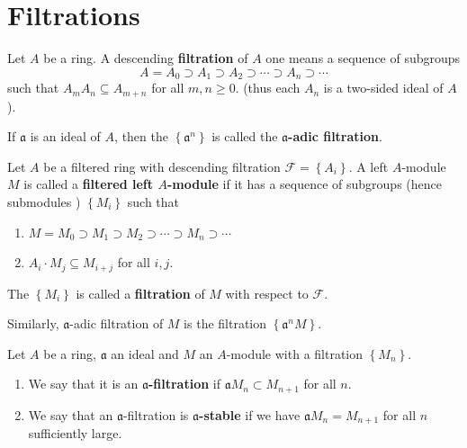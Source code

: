 \section{Filtrations} %
\begin{definition}
    Let $A$ be a ring.
    A descending \textbf{filtration} of $A$ one means a sequence of subgroups
    \begin{equation*}
        A=A_0 \supset A_1 \supset A_2 \supset \cdots \supset A_n \supset \cdots
    \end{equation*}
    such that $A_m A_n \subseteq A_{m+n}$ for all $m, n \geqslant 0$. (thus each $A_n$ is a two-sided ideal of $A$).

    If $\mathfrak{a}$ is an ideal of $A$, then the $\left\{\mathfrak{a}^n\right\}$ is called the \textbf{$\mathfrak{a}$-adic filtration}.
\end{definition}
\begin{definition}
    Let $A$ be a filtered ring with descending filtration $\mathcal{F}=\left\{A_i\right\}$.
    A left $A$-module $M$ is called a \textbf{filtered left $A$-module} if it has a sequence of subgroups (hence submodules ) $\left\{M_i\right\}$ such that
    \begin{enumerate}[label=(\roman*)]
        \item
              $M=M_0 \supset M_1 \supset M_2 \supset \cdots \supset M_n \supset \cdots$
        \item
              $A_i  \cdot M_j \subseteq M_{i+j}$ for all $i,j$.
    \end{enumerate}
    The $\left\{M_i\right\}$ is called a \textbf{filtration} of $M$ with respect to $\mathcal{F}$.

    Similarly, $\mathfrak{a}$-adic filtration of $M$ is the filtration $\left\{\mathfrak{a}^n M\right\}$.
\end{definition}

\begin{definition}
    Let $A$ be a ring, $\mathfrak{a}$ an ideal and $M$ an $A$-module with a filtration $\left\{M_n\right\}$.
    \begin{enumerate}[resume]
        \item
              We say that it is an \textbf{$\mathfrak{a}$-filtration} if $\mathfrak{a} M_n \subset M_{n+1}$ for all $n$.


        \item
              We say that an $\mathfrak{a}$-filtration is \textbf{$\mathfrak{a}$-stable} if we have $\mathfrak{a} M_n=M_{n+1}$ for all $n$ sufficiently large.
    \end{enumerate}
\end{definition}



